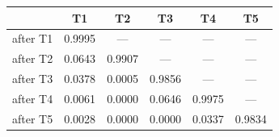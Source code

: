 \begin{tabular}{@{}lccccc@{}}
\toprule
& \textbf{T1} & \textbf{T2} & \textbf{T3} & \textbf{T4} & \textbf{T5} \\
\midrule
after T1 & 0.9995 & --- & --- & --- & --- \\
after T2 & 0.0643 & 0.9907 & --- & --- & --- \\
after T3 & 0.0378 & 0.0005 & 0.9856 & --- & --- \\
after T4 & 0.0061 & 0.0000 & 0.0646 & 0.9975 & --- \\
after T5 & 0.0028 & 0.0000 & 0.0000 & 0.0337 & 0.9834 \\
\bottomrule
\end{tabular}
